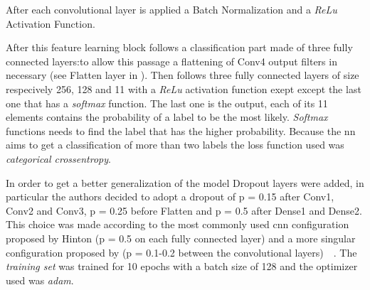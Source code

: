 After each convolutional layer is applied a Batch Normalization and a \textit{ReLu} Activation Function.

After this feature learning block follows a classification part made of three fully connected layers:to allow this passage a flattening of Conv4 output filters in necessary (see Flatten layer in ). Then follows three fully connected layers of size respecively 256, 128 and 11 with a \textit{ReLu} activation function exept except the last one that has a \textit{softmax} function. The last one is the output, each of its 11 elements contains the probability of a label to be the most likely. \textit{Softmax} functions needs to find the label that has the higher probability. Because the \gls{nn} aims to get a classification of more than two labels the loss function used was \textit{categorical crossentropy}.

In order to get a better generalization of the model Dropout layers were added, in particular the authors decided to adopt a dropout of p = 0.15 after Conv1, Conv2 and Conv3, p = 0.25 before Flatten and p = 0.5 after Dense1 and Dense2. This choice was made according to the most commonly used \gls{cnn} configuration proposed by Hinton (p = 0.5 on each fully connected layer) and a more singular configuration proposed by  (p = 0.1-0.2 between the convolutional layers)~\cite{Hinton12}~\cite{Sungheon17}.
The \textit{training set} was trained for 10 epochs with a batch size of 128 and the optimizer used was \textit{adam}. 
